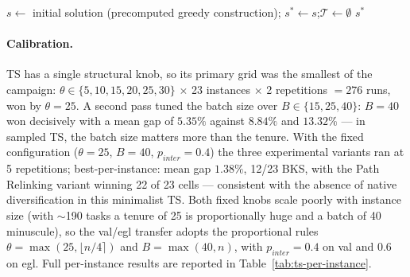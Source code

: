 \begin{algorithm}[htbp]
\DontPrintSemicolon
\caption{Tabu Search for the CARP}
\label{alg:ts-carp}


\BlankLine
$s \leftarrow$ initial solution (precomputed greedy construction);\quad
$s^{*} \leftarrow s$;\quad $\mathcal{T} \leftarrow \emptyset$
\Return $s^{*}$\;
\end{algorithm}

\paragraph{Calibration.} TS has a single structural knob, so its primary
grid was the smallest of the campaign: $\theta \in \{5, 10, 15, 20, 25,
30\}$ $\times$ 23 instances $\times$ 2 repetitions $= 276$ runs, won by
$\theta = 25$. A second pass tuned the batch size over $B \in \{15, 25,
40\}$: $B = 40$ won decisively with a mean gap of $5.35\%$ against
$8.84\%$ and $13.32\%$ --- in sampled TS, the batch size matters more than
the tenure. With the fixed configuration ($\theta = 25$, $B = 40$,
$p_{inter} = 0.4$) the three experimental variants ran at 5 repetitions;
best-per-instance: mean gap $1.38\%$, 12/23 BKS, with the Path Relinking
variant winning 22 of 23 cells --- consistent with the absence of native
diversification in this minimalist TS. Both fixed knobs scale poorly with
instance size (with $\sim$190 tasks a tenure of 25 is proportionally huge
and a batch of 40 minuscule), so the val/egl transfer adopts the
proportional rules $\theta = \max(25, \lfloor n/4 \rceil)$ and
$B = \max(40, n)$, with $p_{inter} = 0.4$ on val and $0.6$ on egl. Full
per-instance results are reported in Table~\ref{tab:ts-per-instance}.

